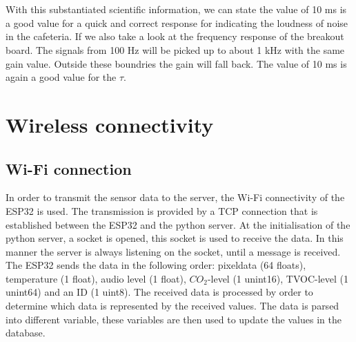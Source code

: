 \documentclass[11pt,a4paper]{article}
\begin{document}
\\ \\ With this substantiated scientific information, we can state the value of 10 ms is a good value for a quick and correct response for indicating the loudness of noise in the cafeteria. If we also take a look at the frequency response of the breakout board. The signals from 100 Hz will be picked up to about 1 kHz with the same gain value. Outside these boundries the gain will fall back. The value of 10 ms is again a good value for the $\tau$.




\section{Wireless connectivity}
\subsection{Wi-Fi connection}
In order to transmit the sensor data to the server, the Wi-Fi connectivity of the ESP32 is used. The transmission is provided by a TCP connection that is established between the ESP32 and the python server. At the initialisation of the python server, a socket is opened, this socket is used to receive the data. In this manner the server is always listening on the socket, until a message is received. The ESP32 sends the data in the following order: pixeldata (64 floats), temperature (1 float), audio level (1 float), $CO_2$-level (1 unint16), TVOC-level (1 unint64) and an ID (1 uint8). The received data is processed by order to determine which data is represented by the received values. The data is parsed into different variable, these variables are then used to update the values in the database. 
\end{document}
